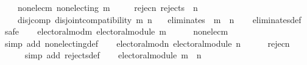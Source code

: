 \begin{isabellebody}
\ \ \ \ non{\isacharunderscore}{\kern0pt}elec{\isacharunderscore}{\kern0pt}m{\isacharcolon}{\kern0pt}\ {\isachardoublequoteopen}non{\isacharunderscore}{\kern0pt}electing\ m{\isachardoublequoteclose}\ \isanewline
\ \ \ \ rejec{\isacharunderscore}{\kern0pt}n{\isacharunderscore}{\kern0pt}{}{\isacharcolon}{\kern0pt}\ {\isachardoublequoteopen}rejects\ {}\ n{\isachardoublequoteclose}\ \isanewline
\ \ \ \ disj{\isacharunderscore}{\kern0pt}comp{\isacharcolon}{\kern0pt}\ {\isachardoublequoteopen}disjoint{\isacharunderscore}{\kern0pt}compatibility\ m\ n{\isachardoublequoteclose}\isanewline
\ \ \ {\isachardoublequoteopen}eliminates\ {}\ {\isacharparenleft}{\kern0pt}m\ {\isasymparallel}\isactrlsub {\isasymup}\ n{\isacharparenright}{\kern0pt}{\isachardoublequoteclose}\isanewline
%
\isadelimproof
\ \ %
\endisadelimproof
%
\isatagproof
{}\isamarkupfalse%
\ eliminates{\isacharunderscore}{\kern0pt}def\isanewline
{}\isamarkupfalse%
\ {\isacharparenleft}{\kern0pt}safe{\isacharparenright}{\kern0pt}\isanewline
\ \ \isamarkupfalse%
\ electoral{\isacharunderscore}{\kern0pt}mod{\isacharunderscore}{\kern0pt}m{\isacharcolon}{\kern0pt}\ {\isachardoublequoteopen}electoral{\isacharunderscore}{\kern0pt}module\ m{\isachardoublequoteclose}\isanewline
\ \ \ \ \isamarkupfalse%
\ non{\isacharunderscore}{\kern0pt}elec{\isacharunderscore}{\kern0pt}m\isanewline
\ \ \ \ \isamarkupfalse%
\ {\isacharparenleft}{\kern0pt}simp\ add{\isacharcolon}{\kern0pt}\ non{\isacharunderscore}{\kern0pt}electing{\isacharunderscore}{\kern0pt}def{\isacharparenright}{\kern0pt}\isanewline
\ \ \isamarkupfalse%
\ electoral{\isacharunderscore}{\kern0pt}mod{\isacharunderscore}{\kern0pt}n{\isacharcolon}{\kern0pt}\ {\isachardoublequoteopen}electoral{\isacharunderscore}{\kern0pt}module\ n{\isachardoublequoteclose}\isanewline
\ \ \ \ \isamarkupfalse%
\ rejec{\isacharunderscore}{\kern0pt}n{\isacharunderscore}{\kern0pt}{}\isanewline
\ \ \ \ \isamarkupfalse%
\ {\isacharparenleft}{\kern0pt}simp\ add{\isacharcolon}{\kern0pt}\ rejects{\isacharunderscore}{\kern0pt}def{\isacharparenright}{\kern0pt}\isanewline
\ \ \isamarkupfalse%
\ {\isachardoublequoteopen}electoral{\isacharunderscore}{\kern0pt}module\ {\isacharparenleft}{\kern0pt}m\ {\isasymparallel}\isactrlsub {\isasymup}\ n{\isacharparenright}{\kern0pt}{\isachardoublequoteclose}\isanewline
\ \ \ \ \isamarkupfalse%

\end{isabellebody}
